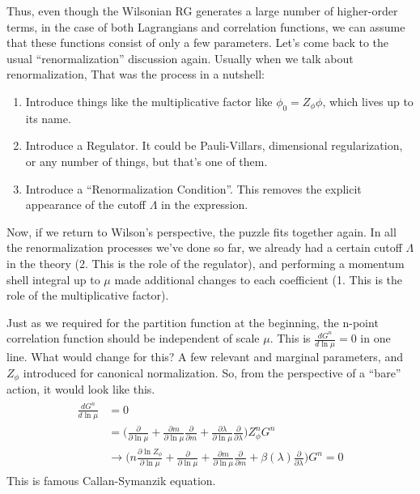 \documentclass[12pt,halfline,a4paper]{ouparticle}
\begin{document}
Thus, even though the Wilsonian RG generates a large number of higher-order terms, in the case of both Lagrangians and correlation functions, we can assume that these functions consist of only a few parameters.
Let's come back to the usual “renormalization” discussion again. Usually when we talk about renormalization, That was the process in a nutshell:
\begin{enumerate}
	\item Introduce things like the multiplicative factor like $\phi_0 = Z_\phi\phi$, which lives up to its name.
	\item Introduce a Regulator. It could be Pauli-Villars, dimensional regularization, or any number of things, but that's one of them.
	\item Introduce a “Renormalization Condition”. This removes the explicit appearance of the cutoff $\Lambda$ in the expression.
\end{enumerate}

Now, if we return to Wilson's perspective, the puzzle fits together again. In all the renormalization processes we've done so far, we already had a certain cutoff $\Lambda$ in the theory (2. This is the role of the regulator), and performing a momentum shell integral up to $\mu$ made additional changes to each coefficient (1. This is the role of the multiplicative factor).



Just as we required for the partition function at the beginning, the n-point correlation function should be independent of scale $\mu$. This is $\frac{dG^{n}}{d\ln\mu}=0$ in one line. What would change for this?
A few relevant and marginal parameters, and $Z_\phi$ introduced for canonical normalization. So, from the perspective of a “bare” action, it would look like this.
\begin{align}
	\begin{split}
		\frac{dG^{n}}{d\ln\mu}&=0\\
		&=\bigg(\frac{\partial}{\partial\ln\mu}+\frac{\partial m}{\partial\ln\mu}\frac{\partial }{\partial m}+\frac{\partial \lambda}{\partial \ln \mu}\frac{\partial }{\partial\lambda}\bigg)Z_\phi^n G^n\\
		&\rightarrow\bigg(n\frac{\partial \ln Z_\phi}{\partial\ln\mu}+\frac{\partial}{\partial\ln\mu}+\frac{\partial m}{\partial\ln\mu}\frac{\partial }{\partial m}+\beta(\lambda)\frac{\partial }{\partial\lambda}\bigg)G^n=0
	\end{split}
\end{align}
This is famous Callan-Symanzik equation. 
\end{document}
